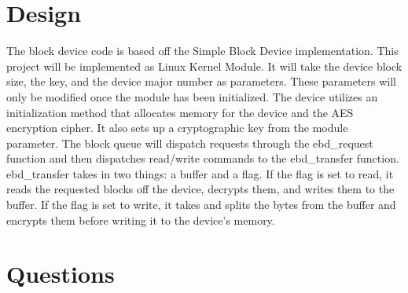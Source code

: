 \documentclass[onecolumn, draftclsnofoot,10pt, compsoc]{IEEEtran}
\begin{document}


\section{Design}
The block device code is based off the Simple Block Device implementation. This project will be implemented as Linux Kernel Module. It will take the device block size, the key, and the device major number as parameters. These parameters will only be modified once the module has been initialized.  The device utilizes an initialization method that allocates memory for the device and the AES encryption cipher. It also sets up a cryptographic key from the module parameter. The block queue will dispatch requests through the ebd\_request function and then dispatches read/write commands to the ebd\_transfer function. ebd\_transfer takes in two things: a buffer and a flag. If the flag is set to read, it reads the requested blocks off the device, decrypts them, and writes them to the buffer. If the flag is set to write, it takes and splits the bytes from the buffer and encrypts them before writing it to the device's memory.
\section{Questions}
\end{document}
